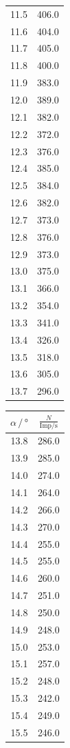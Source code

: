 \begin{table}
\begin{tabular}[t]{cc}
  11.5 & 406.0\\
  11.6 & 404.0\\
  11.7 & 405.0\\
  11.8 & 400.0\\
  11.9 & 383.0\\
  12.0 & 389.0\\
  12.1 & 382.0\\
  12.2 & 372.0\\
  12.3 & 376.0\\
  12.4 & 385.0\\
  12.5 & 384.0\\
  12.6 & 382.0\\
  12.7 & 373.0\\
  12.8 & 376.0\\
  12.9 & 373.0\\
  13.0 & 375.0\\
  13.1 & 366.0\\
  13.2 & 354.0\\
  13.3 & 341.0\\
  13.4 & 326.0\\
  13.5 & 318.0\\
  13.6 & 305.0\\
  13.7 & 296.0  \\
  \bottomrule
  \end{tabular}
  \begin{tabular}[t]{cc}
  \toprule
  $\alpha \,/\, \si{\degree} $ & $\frac{N}{\text{Imp}/\si{\second}}$ \\
  \midrule
  13.8 & 286.0  \\
  13.9 & 285.0  \\
  14.0 & 274.0  \\
  14.1 & 264.0  \\
  14.2 & 266.0  \\
  14.3 & 270.0  \\
  14.4 & 255.0  \\
  14.5 & 255.0  \\
  14.6 & 260.0  \\
  14.7 & 251.0  \\
  14.8 & 250.0  \\
  14.9 & 248.0  \\
  15.0 & 253.0  \\
  15.1 & 257.0  \\
  15.2 & 248.0  \\
  15.3 & 242.0  \\
  15.4 & 249.0  \\
  15.5 & 246.0  \\

\end{tabular}
\end{table}
